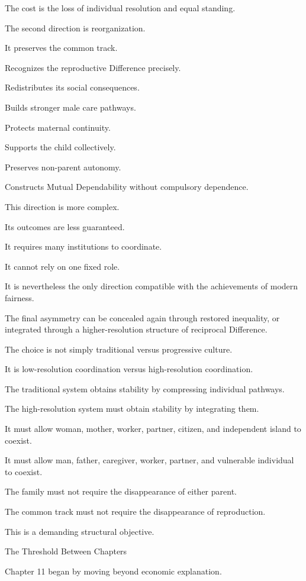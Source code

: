 The cost is the loss of individual resolution and equal standing.

The second direction is reorganization.

It preserves the common track.

Recognizes the reproductive Difference precisely.

Redistributes its social consequences.

Builds stronger male care pathways.

Protects maternal continuity.

Supports the child collectively.

Preserves non-parent autonomy.

Constructs Mutual Dependability without compulsory dependence.

This direction is more complex.

Its outcomes are less guaranteed.

It requires many institutions to coordinate.

It cannot rely on one fixed role.

It is nevertheless the only direction compatible with the achievements of modern fairness.

The final asymmetry can be concealed again through restored inequality, or integrated through a higher-resolution structure of reciprocal Difference.

The choice is not simply traditional versus progressive culture.

It is low-resolution coordination versus high-resolution coordination.

The traditional system obtains stability by compressing individual pathways.

The high-resolution system must obtain stability by integrating them.

It must allow woman, mother, worker, partner, citizen, and independent island to coexist.

It must allow man, father, caregiver, worker, partner, and vulnerable individual to coexist.

The family must not require the disappearance of either parent.

The common track must not require the disappearance of reproduction.

This is a demanding structural objective.

The Threshold Between Chapters

Chapter 11 began by moving beyond economic explanation.

